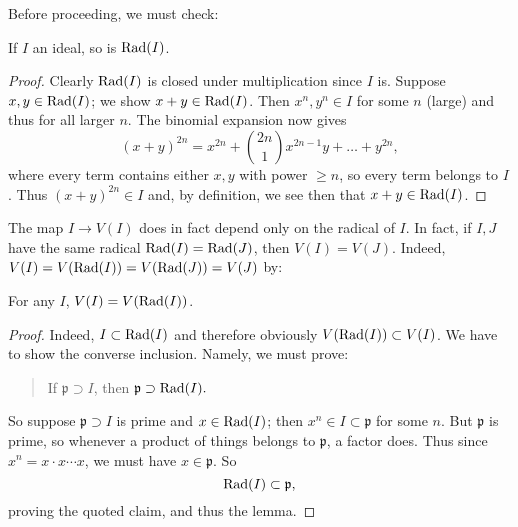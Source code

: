 Before proceeding, we must check:
\begin{lemma} 
If $I$ an ideal, so is $\operatorname{Rad}(I)$.
\end{lemma} 
\begin{proof} 
Clearly $\operatorname{Rad}(I)$ is closed under multiplication since $I$ is.
Suppose $x,y \in \operatorname{Rad}(I)$; we show $x+y \in \operatorname{Rad}(I)$. Then $x^n,
y^n \in I$
for some $n$ (large) and thus for all larger $n$. The binomial
expansion now
gives
\[ (x+y)^{2n} = x^{2n} + \binom{2n}{1} x^{2n-1}y + \dots +
y^{2n}, \]
where every term contains either $x,y$ with power $ \geq n$, so
every term
belongs to $I$. Thus $(x+y)^{2n} \in I$ and, by definition, we
see then that $x+y \in \operatorname{Rad}(I)$.
\end{proof} 

The map $I \to V(I)$ does in fact depend only on the radical of
$I$. In fact, if $I,J$ have the same radical $\operatorname{Rad}(I) =
\operatorname{Rad}(J)$, then $V(I) = V(J)$.
Indeed, $V(I) = V(\operatorname{Rad}(I)) = V(\operatorname{Rad}(J)) = V(J)$ by:
\begin{lemma} 
For any $I$, $V(I) = V(\operatorname{Rad}(I))$.
\end{lemma} 
\begin{proof} 
Indeed, $I \subset \operatorname{Rad}(I)$ and therefore obviously $V(\operatorname{Rad}(I))
\subset V(I)$. We have to show the
converse inclusion. Namely, we must prove:
\begin{quote}
If $\mathfrak{p} \supset I$, then $\mathfrak{p} \supset
\operatorname{Rad}(I).$
\end{quote}
So suppose $\mathfrak{p} \supset I$ is prime and $x \in
\operatorname{Rad}(I)$; then $x^n \in I \subset \mathfrak{p}$ for some $n$.
But $\mathfrak{p}$ is prime, so whenever a product of things
belongs to
$\mathfrak{p}$, a factor does. Thus since $x^n = x \cdot x
\cdots x$, we must
have $x \in \mathfrak{p}$. So
\[ \operatorname{Rad}(I) \subset \mathfrak{p},  \]
proving the quoted claim, and thus the lemma.
\end{proof} 

